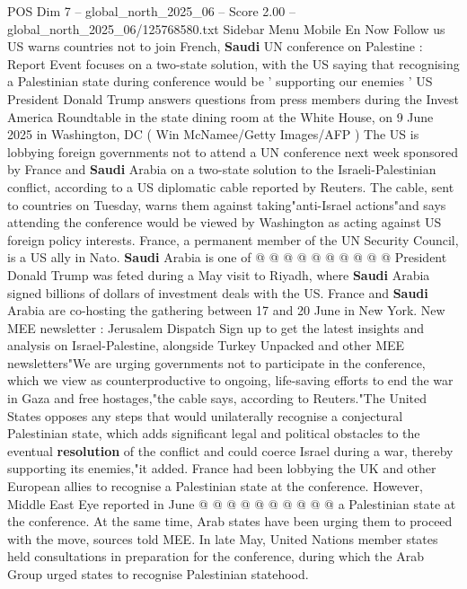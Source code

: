 \begin{textsample}{POS Dim 7 – global\_north\_2025\_06 – Score 2.00 – global\_north\_2025\_06/125768580.txt}  \label{ex:f7_pos_378}
Sidebar Menu Mobile En Now Follow us US warns countries not to join French, \textbf{Saudi} UN conference on Palestine : Report Event focuses on a two-state solution, with the US saying that recognising a Palestinian state during conference would be ' supporting our enemies ' US President Donald Trump answers questions from press members during the Invest America Roundtable in the state dining room at the White House, on 9 June 2025 in Washington, DC ( Win McNamee/Getty Images/AFP ) The US is lobbying foreign governments not to attend a UN conference next week sponsored by France and \textbf{Saudi} Arabia on a two-state solution to the Israeli-Palestinian conflict, according to a US diplomatic cable reported by Reuters.
The cable, sent to countries on Tuesday, warns them against taking"anti-Israel actions"and says attending the conference would be viewed by Washington as acting against US foreign policy interests.
France, a permanent member of the UN Security Council, is a US ally in Nato. \textbf{Saudi} Arabia is one of @ @ @ @ @ @ @ @ @ @ President Donald Trump was feted during a May visit to Riyadh, where \textbf{Saudi} Arabia signed billions of dollars of investment deals with the US.
France and \textbf{Saudi} Arabia are co-hosting the gathering between 17 and 20 June in New York.
New MEE newsletter : Jerusalem Dispatch Sign up to get the latest insights and analysis on Israel-Palestine, alongside Turkey Unpacked and other MEE newsletters"We are urging governments not to participate in the conference, which we view as counterproductive to ongoing, life-saving efforts to end the war in Gaza and free hostages,"the cable says, according to Reuters."The United States opposes any steps that would unilaterally recognise a conjectural Palestinian state, which adds significant legal and political obstacles to the eventual \textbf{resolution} of the conflict and could coerce Israel during a war, thereby supporting its enemies,"it added.
France had been lobbying the UK and other European allies to recognise a Palestinian state at the conference.
However, Middle East Eye reported in June @ @ @ @ @ @ @ @ @ @ a Palestinian state at the conference.
At the same time, Arab states have been urging them to proceed with the move, sources told MEE.
In late May, United Nations member states held consultations in preparation for the conference, during which the Arab Group urged states to recognise Palestinian statehood.

\end{textsample}
